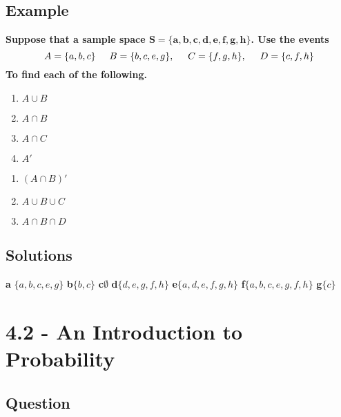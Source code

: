\documentclass{report}
\begin{document}
\subsection*{Example}
\textbf{Suppose that a sample space $\mathbf{S = \{a,b,c,d,e,f,g,h\}}$. Use the events 
$$A = \{a,b,c\}\hspace{5mm} B = \{b,c,e,g\},\hspace{5mm} C = \{f,g,h\},\hspace{5mm} D = \{c,f,h\}$$ To find each of the following.}
\bigbreak
\begin{center}
  \hspace{24mm}\begin{minipage}{0.4\textwidth}
 \begin{enumerate}
   \item $A \cup B$
   \item $A \cap B$
   \item $A \cap C$
    \item $A'$
 \end{enumerate} 
\end{minipage}
\begin{minipage}{0.45\textwidth}
  \begin{enumerate}
    \vspace{-5mm}

    \item $(A \cap B)'$
    \item $A \cup B \cup C$
    \item $A \cap B \cap D$
  \end{enumerate}
\end{minipage}
\end{center}
\pagebreak
\subsection*{Solutions}
\bigbreak \noindent
\textbf{a} $\{a,b,c,e,g\}$
\bigbreak\noindent
\textbf{b}$\{b,c\}$
\bigbreak\noindent
\textbf{c}$\emptyset$
\bigbreak\noindent
\textbf{d}$\{d,e,g,f,h\}$
\bigbreak\noindent
\textbf{e}$\{a,d,e,f,g,h\}$
\bigbreak\noindent
\textbf{f}$\{a,b,c,e,g,f,h\}$
\bigbreak\noindent
\textbf{g}$\{c\}$
\section*{4.2 - An Introduction to Probability}
\bigbreak \noindent
\subsection*{Question}
\vspace{3mm}
\end{document}
